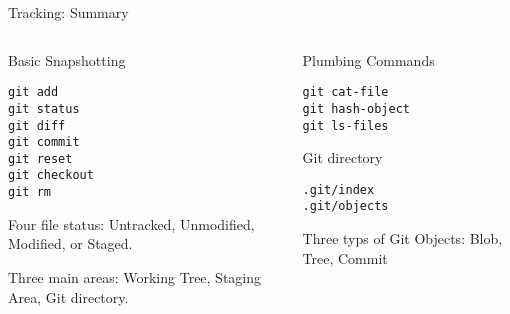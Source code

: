 \begin{frame}[fragile]{Tracking: Summary}
  \begin{columns}
    \begin{column}{0.5\textwidth}
Basic Snapshotting
      \begin{verbatim}
git add
git status
git diff
git commit
git reset
git checkout
git rm
      \end{verbatim}
      \begin{flushleft}
        Four file status: Untracked, Unmodified, Modified, or Staged.
      \end{flushleft}
      \begin{flushleft}
        Three main areas: Working Tree, Staging Area, Git directory.
      \end{flushleft}
    \end{column}
    \begin{column}{0.5\textwidth}
Plumbing Commands
      \begin{verbatim}
git cat-file
git hash-object
git ls-files
      \end{verbatim}
Git directory
      \begin{verbatim}
.git/index
.git/objects
      \end{verbatim}
      \begin{flushleft}
        Three typs of Git Objects: \break Blob, Tree, Commit
      \end{flushleft}
    \end{column}
  \end{columns}
\end{frame}
